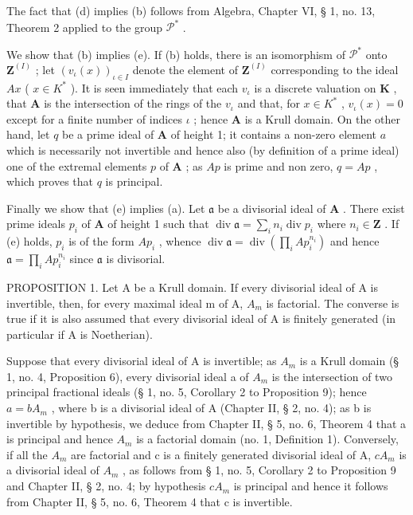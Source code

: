 The fact that (d) implies (b) follows from Algebra, Chapter VI, § 1, no. 13, Theorem 2 applied to the group \(\mathcal{P}^*\) .

We show that (b) implies (e). If (b) holds, there is an isomorphism of \(\mathcal{P}^*\) onto \(\mathbf{Z}^{(I)}\) ; let \((v_{\iota}(x))_{\iota\in I}\) denote the element of \(\mathbf{Z}^{(I)}\) corresponding to the ideal \(Ax\) ( \(x\in K^*\) ). It is seen immediately that each \(v_{\iota}\) is a discrete valuation on \(\mathbf{K}\) , that \(\mathbf{A}\) is the intersection of the rings of the \(v_{\iota}\) and that, for \(x\in K^*\) , \(v_{\iota}(x)=0\) except for a finite number of indices \(\iota\) ; hence \(\mathbf{A}\) is a Krull domain. On the other hand, let \(q\) be a prime ideal of \(\mathbf{A}\) of height 1; it contains a non-zero element \(a\) which is necessarily not invertible and hence also (by definition of a prime ideal) one of the extremal elements \(p\) of \(\mathbf{A}\) ; as \(Ap\) is prime and non zero, \(q=Ap\) , which proves that \(q\) is principal.

Finally we show that (e) implies (a). Let \(\mathfrak{a}\) be a divisorial ideal of \(\mathbf{A}\) . There exist prime ideals \(p_i\) of \(\mathbf{A}\) of height 1 such that \(\operatorname{div} \mathfrak{a} = \sum_{i} n_i \operatorname{div} p_i\) where \(n_i \in \mathbf{Z}\) . If (e) holds, \(p_i\) is of the form \(A p_i\) , whence \(\operatorname{div} \mathfrak{a} = \operatorname{div}\left(\prod_{i} A p_i^{n_i}\right)\) and hence \(\mathfrak{a} = \prod_{i} A p_i^{n_i}\) since \(\mathfrak{a}\) is divisorial.

PROPOSITION 1. Let A be a Krull domain. If every divisorial ideal of A is invertible, then, for every maximal ideal m of A, \(A_{m}\) is factorial. The converse is true if it is also assumed that every divisorial ideal of A is finitely generated (in particular if A is Noetherian).

Suppose that every divisorial ideal of A is invertible; as \(A_{m}\) is a Krull domain (§ 1, no. 4, Proposition 6), every divisorial ideal a of \(A_{m}\) is the intersection of two principal fractional ideals (§ 1, no. 5, Corollary 2 to Proposition 9); hence \(a = bA_{m}\) , where b is a divisorial ideal of A (Chapter II, § 2, no. 4); as b is invertible by hypothesis, we deduce from Chapter II, § 5, no. 6, Theorem 4 that a is principal and hence \(A_{m}\) is a factorial domain (no. 1, Definition 1). Conversely, if all the \(A_{m}\) are factorial and c is a finitely generated divisorial ideal of A, \(cA_{m}\) is a divisorial ideal of \(A_{m}\) , as follows from § 1, no. 5, Corollary 2 to Proposition 9 and Chapter II, § 2, no. 4; by hypothesis \(cA_{m}\) is principal and hence it follows from Chapter II, § 5, no. 6, Theorem 4 that c is invertible.

